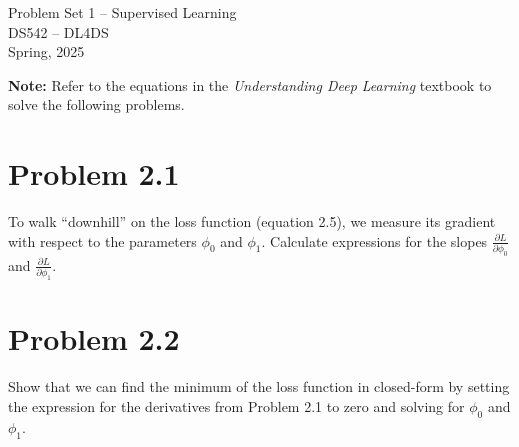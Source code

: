 \documentclass[10pt]{article}
\begin{document}
\begin{center}
    \LARGE {Problem Set 1 – Supervised Learning} \\[1em]
    \Large{DS542 – DL4DS} \\[0.5em]
    \large Spring, 2025
\end{center}

\vspace{2em}

\noindent\textbf{Note:} Refer to the equations in the \textit{Understanding Deep Learning} textbook to solve the following problems.

\vspace{2em}

\section*{Problem 2.1}

To walk “downhill” on the loss function (equation 2.5), we measure its gradient with respect to the parameters $\phi_0$ and $\phi_1$. Calculate expressions for the slopes $\frac{\partial L}{\partial \phi_0}$ and $\frac{\partial L}{\partial \phi_1}$.

\vspace{20em}

\section*{Problem 2.2}

Show that we can find the minimum of the loss function in closed-form by setting the expression for the derivatives from Problem 2.1 to zero and solving for $\phi_0$ and $\phi_1$.
\end{document}
